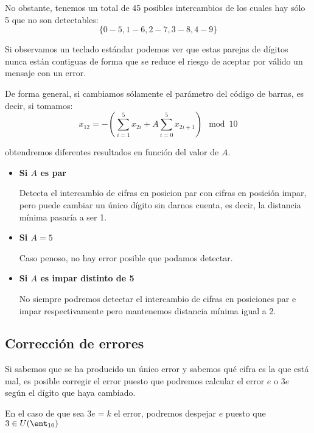 No obstante, tenemos un total de 45 posibles intercambios de los cuales hay sólo 5 que no son detectables:
\[\{0-5,1-6,2-7,3-8,4-9\}\]

\obs Si observamos un teclado estándar podemos ver que estas parejas de dígitos nunca están contiguas de forma que se reduce el riesgo de aceptar por válido un mensaje con un error.

De forma general, si cambiamos sólamente el parámetro del código de barras, es decir, si tomamos:
\[x_{12} = -\left(\sum_{i=1}^5x_{2i} + A \sum_{i=0}^5x_{2i+1} \right)\mod 10\]

obtendremos diferentes resultados en función del valor de $A$.
\begin{itemize}
\item \textbf{Si $A$ es par}

Detecta el intercambio de cifras en posicion par con cifras en posición impar, pero puede cambiar un único dígito sin darnos cuenta, es decir, la distancia mínima pasaría a ser 1.

\item \textbf{Si $A=5$ }

Caso penoso, no hay error posible que podamos detectar.

\item \textbf{Si $A$ es impar distinto de 5}

No siempre podremos detectar el intercambio de cifras en posiciones par e impar respectivamente pero mantenemos distancia mínima igual a 2.
\end{itemize}

\subsection{Corrección de errores}
Si sabemos que se ha producido un único error y sabemos qué cifra es la que está mal, es posible corregir el error puesto que podremos calcular el error $e$ o $3e$ según el dígito que haya cambiado.

En el caso de que sea $3e =k$ el error, podremos despejar $e$ puesto que $3 \in U(\ent_{10})$

